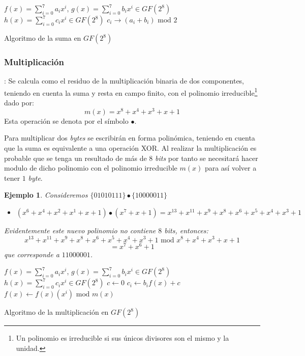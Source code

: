 \documentclass[peerreview]{IEEEtran}
\newtheorem{ejem}{\textbf{Ejemplo}}
\begin{document}
\begin{algorithm}
  \begin{algorithmic}[1]
    \REQUIRE{} $f(x)=\sum_{i=0}^{7}a_{i}x^{i}$, $g(x)=\sum_{i=0}^{7}b_{i}x^{i}
      \in GF(2^8)$
    \ENSURE{}  $h(x)=\sum_{i=0}^{7}c_{i}x^i \in GF(2^8)$
    \STATE{} $c_i  \to (a_i + b_i) \text{ mod } 2$
    \ENDFOR{}
  \end{algorithmic}

  \caption{Algoritmo de la suma en $GF(2^8)$}
  \label{a1}
\end{algorithm}
\subsubsection{Multiplicación}: Se calcula como el residuo de la multiplicación
binaria de dos componentes, teniendo en cuenta la suma y resta en campo finito,
con el polinomio irreducible\footnote{Un polinomio es irreducible si sus únicos
  divisores son el mismo y la unidad.} dado por:
\[m(x)=x^8 + x^4 + x^3 + x +1 \]
Esta operación se denota por el símbolo $\bullet$.

Para multiplicar dos \textit{bytes} se escribirán en forma polinómica, teniendo
en cuenta que la suma es equivalente a una operación XOR. Al realizar la
multiplicación es probable que se tenga un resultado de más de $8$
\textit{bits} por tanto se necesitará hacer modulo de dicho polinomio con el
polinomio irreducible $m(x)$ para así volver a tener $1$ \textit{byte}.

\begin{ejem}
	 Consideremos $\{01010111\}\bullet\{10000011\}$
	\begin{itemize}
		\item $(x^6 +x^4 +x^2 +x^1 + x +1)\bullet(x^7 + x+1)= x^{13} + x^{11} + x^{
			9}+x^{8}+x^{6}+x^5 + x^4 + x^3 +1$
	\end{itemize}
	Evidentemente este nuevo polinomio no contiene $8$ \textit{bits}, entonces:
	\[x^{13} + x^{11} + x^{9}+x^{8}+x^{6}+x^5 + x^4 + x^3 +1 \text{ mod } x^8 + x^4
	+x^3 +x +1\]
	\[=x^7 + x^6 +1\] que corresponde a $11000001$.
\end{ejem}
\begin{algorithm}
  \begin{algorithmic}[1]
    \REQUIRE{} $f(x)=\sum_{i=0}^{7}a_{i}x^{i}$, $g(x)=\sum_{i=0}^{7}b_{i}x^{i}
      \in GF(2^8)$
    \ENSURE{}  $h(x)=\sum_{i=0}^{7}c_{i}x^i \in GF(2^8)$
    \STATE{} $c \leftarrow 0$
    \STATE{} $c_i  \leftarrow b_i f(x) + c$
    \STATE{} $f(x) \leftarrow f(x)(x^i) \text{ mod } m(x)$
    \ENDFOR{}
  \end{algorithmic}

  \caption{Algoritmo de la multiplicación en $GF(2^8)$}
  \label{a2}
\end{algorithm}
\end{document}
